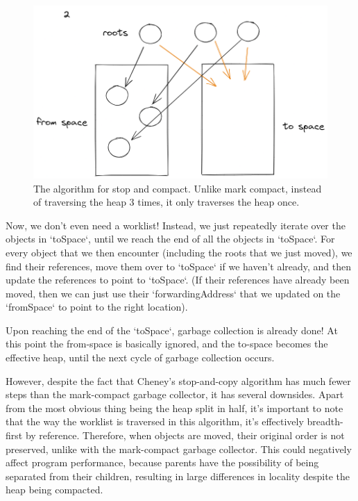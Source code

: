 \documentclass[index]{subfiles}
\begin{document}
\begin{figure}[H]
    \centering
    \includegraphics[scale=0.3]{pics/visualization-of-worklist.png}
    \caption{The algorithm for stop and compact. Unlike mark compact, instead of traversing the heap 3 times, it only traverses the heap once.}
\end{figure}

Now, we don't even need a worklist! Instead, we just repeatedly iterate over the objects in `toSpace`, until we reach the end of all the objects in `toSpace`. For every object that we then encounter (including the roots that we just moved), we find their references, move them over to `toSpace` if we haven't already, and then update the references to point to `toSpace`. (If their references have already been moved, then we can just use their `forwardingAddress` that we updated on the `fromSpace` to point to the right location).

Upon reaching the end of the `toSpace`, garbage collection is already done! At this point the from-space is basically ignored, and the to-space becomes the effective heap, until the next cycle of garbage collection occurs.

However, despite the fact that Cheney's stop-and-copy algorithm has much fewer steps than the mark-compact garbage collector, it has several downsides. Apart from the most obvious thing being the heap split in half, it's important to note that the way the worklist is traversed in this algorithm, it's effectively breadth-first by reference. Therefore, when objects are moved, their original order is not preserved, unlike with the mark-compact garbage collector. This could negatively affect program performance, because parents have the possibility of being separated from their children, resulting in large differences in locality despite the heap being compacted.
\end{document}
